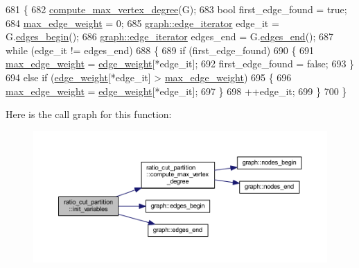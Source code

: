 \begin{DoxyCode}
681 \{
682     \mbox{\hyperlink{classratio__cut__partition_af83d8fc26a0836f4852af5f1db1aff5b}{compute\_max\_vertex\_degree}}(G);
683     \textcolor{keywordtype}{bool} first\_edge\_found = \textcolor{keyword}{true};
684     \mbox{\hyperlink{classratio__cut__partition_a74193c82e8dc7d997780613378919106}{max\_edge\_weight}} = 0;
685     \mbox{\hyperlink{classgraph_a818d3766018eb0af91d520ce2150203c}{graph::edge\_iterator}} edge\_it = G.\mbox{\hyperlink{classgraph_a7ba35a4c4e8343ffb27ed6d9703c6f18}{edges\_begin}}();
686     \mbox{\hyperlink{classgraph_a818d3766018eb0af91d520ce2150203c}{graph::edge\_iterator}} edges\_end = G.\mbox{\hyperlink{classgraph_aea8d7f976b85b6137f52d915e26639f6}{edges\_end}}();
687     \textcolor{keywordflow}{while} (edge\_it != edges\_end)
688     \{
689     \textcolor{keywordflow}{if} (first\_edge\_found)
690     \{
691         \mbox{\hyperlink{classratio__cut__partition_a74193c82e8dc7d997780613378919106}{max\_edge\_weight}} = \mbox{\hyperlink{classratio__cut__partition_a48a85c82fb09b83c9d494d6d1232fab2}{edge\_weight}}[*edge\_it];
692         first\_edge\_found = \textcolor{keyword}{false};
693     \}
694     \textcolor{keywordflow}{else} \textcolor{keywordflow}{if} (\mbox{\hyperlink{classratio__cut__partition_a48a85c82fb09b83c9d494d6d1232fab2}{edge\_weight}}[*edge\_it] > \mbox{\hyperlink{classratio__cut__partition_a74193c82e8dc7d997780613378919106}{max\_edge\_weight}})
695     \{
696         \mbox{\hyperlink{classratio__cut__partition_a74193c82e8dc7d997780613378919106}{max\_edge\_weight}} = \mbox{\hyperlink{classratio__cut__partition_a48a85c82fb09b83c9d494d6d1232fab2}{edge\_weight}}[*edge\_it];
697     \}
698     ++edge\_it;
699     \}
700 \}
\end{DoxyCode}
Here is the call graph for this function\+:\nopagebreak
\begin{figure}[H]
\begin{center}
\leavevmode
\includegraphics[width=350pt]{classratio__cut__partition_ab3054dcfbcd012aba57218fa6d0c471b_cgraph}
\end{center}
\end{figure}
